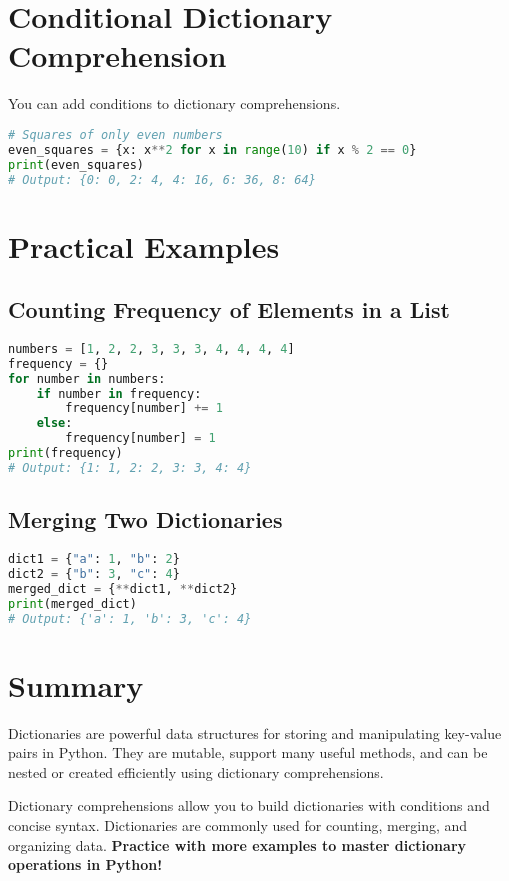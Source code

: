 \section{Conditional Dictionary Comprehension}

You can add conditions to dictionary comprehensions.

\begin{lstlisting}[language=Python]
# Squares of only even numbers
even_squares = {x: x**2 for x in range(10) if x % 2 == 0}
print(even_squares)
# Output: {0: 0, 2: 4, 4: 16, 6: 36, 8: 64}
\end{lstlisting}

\section{Practical Examples}

\subsection{Counting Frequency of Elements in a List}

\begin{lstlisting}[language=Python]
numbers = [1, 2, 2, 3, 3, 3, 4, 4, 4, 4]
frequency = {}
for number in numbers:
    if number in frequency:
        frequency[number] += 1
    else:
        frequency[number] = 1
print(frequency)
# Output: {1: 1, 2: 2, 3: 3, 4: 4}
\end{lstlisting}

\subsection{Merging Two Dictionaries}

\begin{lstlisting}[language=Python]
dict1 = {"a": 1, "b": 2}
dict2 = {"b": 3, "c": 4}
merged_dict = {**dict1, **dict2}
print(merged_dict)
# Output: {'a': 1, 'b': 3, 'c': 4}
\end{lstlisting}

\section{Summary}

Dictionaries are powerful data structures for storing and manipulating key-value pairs in Python.  
They are mutable, support many useful methods, and can be nested or created efficiently using dictionary comprehensions.

Dictionary comprehensions allow you to build dictionaries with conditions and concise syntax.  
Dictionaries are commonly used for counting, merging, and organizing data.  
\textbf{Practice with more examples to master dictionary operations in Python!}


